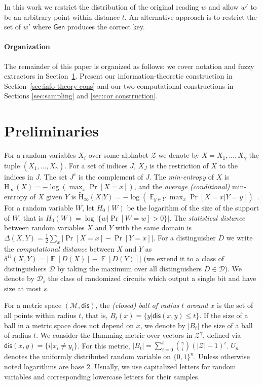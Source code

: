 \documentclass[11pt]{article}
\newcommand{\secref}[1]{\mbox{Section~\ref{#1}}}
\DeclareMathOperator*{\expe}{\mathbb{E}}
\newcommand{\class}[1]{{\ensuremath{\mathsf{#1}}}}
\newcommand{\gen}{\ensuremath{\class{Gen}}\xspace}
\newcommand{\dis}{\ensuremath{\mathsf{dis}}}
\newcommand{\Hoo}{\mathrm{H}_\infty}
\newcommand{\Hav}{\tilde{\mathrm{H}}_\infty}
\begin{document}
In this work we restrict the distribution of the original reading $w$ and allow $w'$ to be an arbitrary point within distance $t$.  An alternative approach is to restrict the set of $w'$ where $\gen$ produces the correct key.%

\medskip
\paragraph{Organization }
The remainder of this paper is organized as follows: we cover notation and fuzzy extractors in \secref{sec:preliminaries}.  Present our information-theoretic construction in \secref{sec:info theory cons} and our two computational constructions in Sections \ref{sec:sampling} and \ref{sec:cor construction}.

\section{Preliminaries}
\label{sec:preliminaries}
For a random variables $X_i$ over some alphabet $\mathcal{Z}$ we denote by $X = X_1,..., X_\gamma$  the tuple $(X_1,\dots, X_\gamma)$.  For a set of indices $J$, $X_{J}$ is the restriction of $X$ to the indices in $J$.  The set $J^c$ is the complement of $J$.  The {\em min-entropy} of $X$ is $\Hoo(X) = -\log(\max_x \Pr[X=x])$,
and the {\em average (conditional)} min-entropy of $X$ given $Y$ is  $\Hav(X|Y) = -\log(\expe_{y\in Y} \max_{x} \Pr[X=x|Y=y])$~\cite[Section 2.4]{DBLP:journals/siamcomp/DodisORS08}.   For a random variable $W$, let $H_0(W)$ be the logarithm of the size of the support of $W$,  that is $H_0(W) = \log |\{w | \Pr[W=w]>0\}|$.
The {\em statistical distance} between random variables $X$ and $Y$ with the same domain is $\Delta(X,Y) = \frac12 \sum_x |\Pr[X=x] - \Pr[Y=x]|$.
For a distinguisher $D$ we write the \emph{computational distance} between $X$ and $Y$ as $\delta^D(X,Y) = \left| \expe[D(X)]-\expe[D(Y)]\right |$ (we extend it to a class of distinguishers $\mathcal{D}$ by taking the maximum over all distinguishers $D\in\mathcal{D}$).  We denote by $\mathcal{D}_{s}$ the class of randomized circuits which output a single bit and have size at most $s$.

For a metric space $(\mathcal{M}, \dis)$, the \emph{(closed) ball of radius $t$ around $x$} is the set of all points within radius $t$, that is, $B_t(x) = \{y| \dis(x, y)\leq t\}$.  If the size of a ball in a metric space does not depend on $x$, we denote by $|B_t|$ the size of a ball of radius $t$.  We consider the Hamming metric over vectors in $\mathcal{Z}^\gamma$, defined via $\dis(x,y) = \{i | x_i \neq y_i\}$.  For this metric, $|B_t| = \sum_{i=0}^t {\gamma \choose i} (|\mathcal{Z}|-1)^i $.  $U_n$ denotes the uniformly  distributed random variable on $\{0,1\}^n$.  Unless otherwise noted logarithms are base $2$.
Usually, we use capitalized letters for random variables and corresponding lowercase letters for their samples.
\end{document}
